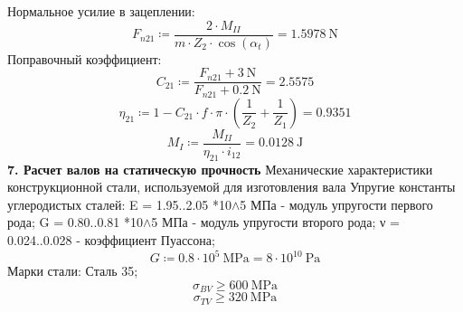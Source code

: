 \documentclass{article}
\newcommand{\defeq}{\coloneq} %
\begin{document}
\colorbox[HTML]{000000}{Нормальное усилие в зацеплении:}\newline
\begin{equation*}
\textit{F}_{\textit{n21}} \defeq \frac{2 \cdot M_{II}}{m \cdot \textit{Z}_{\textit{2}} \cdot \cos \left( α_{t} \right)} = {1.5978 \: \mathrm{N}}
\end{equation*}
\colorbox[HTML]{000000}{Поправочный коэффициент:}\newline
\begin{equation*}
\textit{C}_{\textit{21}} \defeq \frac{\textit{F}_{\textit{n21}}+3 \: \mathrm{N}}{\textit{F}_{\textit{n21}}+0.2 \: \mathrm{N}} = {2.5575}
\end{equation*}
\begin{equation*}
\textit{η}_{\textit{21}} \defeq 1-\textit{C}_{\textit{21}} \cdot f \cdot {\pi} \cdot \left( \frac{1}{\textit{Z}_{\textit{2}}}+\frac{1}{\textit{Z}_{\textit{1}}} \right) = {0.9351}
\end{equation*}
\begin{equation*}
M_{I} \defeq \frac{M_{II}}{\textit{η}_{\textit{21}} \cdot \textit{i}_{\textit{12}}} = {0.0128 \: \mathrm{J}}
\end{equation*}
\colorbox[HTML]{000000}{\textbf{7. Расчет валов на статическую прочность}}\newline
\colorbox[HTML]{000000}{Механические характеристики конструкционной стали, используемой для изготовления вала}\newline
\colorbox[HTML]{000000}{Упругие константы углеродистых сталей:}\newline
\colorbox[HTML]{000000}{E = 1.95..2.05 *10$\wedge$5 МПа - модуль упругости первого рода;}\newline
\colorbox[HTML]{000000}{G = 0.80..0.81 *10$\wedge$5 МПа - модуль упругости второго рода;}\newline
\colorbox[HTML]{000000}{ν = 0.024..0.028 - коэффициент Пуассона;}\newline
\begin{equation*}
G \defeq 0.8 \cdot 10^{5} \: \mathrm{MPa} = {8 \cdot 10^{10} \: \mathrm{Pa}}
\end{equation*}
\colorbox[HTML]{000000}{Марки стали: Сталь 35;}\newline
\begin{equation*}
σ_{BV} \geq 600 \: \mathrm{MPa}
\end{equation*}
\begin{equation*}
σ_{TV} \geq 320 \: \mathrm{MPa}
\end{equation*}
\end{document}
